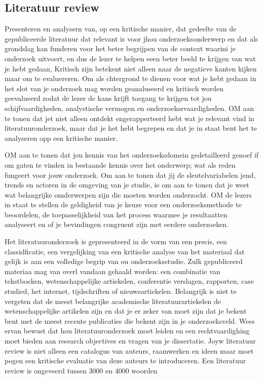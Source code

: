 \subsection{Literatuur review}



Presenteren en analysern van, op een kritische manier, dat gedeelte van de gepubliceerde literatuur dat relevant is voor jhou onderzoeksonderwerp en dat als grondslag kan funderen voor het beter begrijpen van de context waarini je onderzoek uitvoert, en dus de lezer te helpen  eeen beter beeld te krijgen van wat je hebt gedaan,
Kritisch zijn betekent niet alleen naar de negatieve kanten kijken maar om te evaluereren.
Om als chtergrond te dienen voor wat je hebt gedaan in het slot van je onderzoek mag worden geanaluseerd en kritisch worden geevalueerd zodat de lezer de kans krijft toegang te krijgen tot jou schijfvaardigheden, analystische vermogen en onderzoekssvaardigheden.
OM aan te tonen dat jet niet alleen ontdekt engerapperteerd hebt wat je relevant vind in literatuuronderzoek, maar dat je het hebt begrepen en dat je in staat bent het te analyseren opp een kritische manier.


OM aan te tonen dat jou kennis van het onderzoeksdomein gedetailleerd genoef if om gaten te vinden in bestaande kennis over het onderwerp; wat als reden fungeert voor jouw onderzoek. Om aan te tonen dat jij de sleutelvariabelen jend, trends en actoren in de omgeving van je studie, ie om aan te tonen dat je weet wat belangrijke omderwerpen zijn  die moeten worden onderzocht.
OM de lezers in staat te stellen de geldigheid van je keuze voor een onderzoeksmethode te beoordelen, de toepasselijkheid van het process waarmee je resultaatten analyseert en of je bevindingen congruent zijn met eerdere onderzoeken.


Het literatuuronderzoek is gepresenteerd in de vorm van een precis, een classidficatie, een vergelijking van een kritische analyse van het materiaal dat gelijk is aan een volledige begrip van ou onderzoeksstudie. Zulk gepubliceerd materiaa mag van overl vandaan gehaald worden: een combinatie van tekstboeken, wetenschappelijke artiekelen, conferentie verslagen, rapporten, case studied, het internet, tijdschriften of nieuwsartiekelen. Belangrijk is niet te vergeten dat de meest belangrijke academische literatuurartiekelen de wetenschappelijke artikelen zijn en dat je er zeker van moet zijn dat je bekent bent met de meest recente publicaties die bekent zijn in je onderzoeksveld.
Wees ervan bewust dat hou literatuuronderzoek  moet leiden en een rechtvaardighing moet bieden aan research objectives en  vragen van je dissertatie. Joyw literatuur review is niet alleen een catalogus van auteurs, raamwerken en ideen maar moet pogen een kritische evaluatie van deze auteurs te introduceren.
Een literatuur review is ongeveerd tussen 3000 en 4000 woorden



